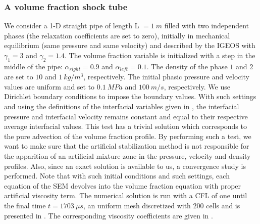 \documentclass[preprint,10pt]{elsarticle}
\begin{document}
\subsubsection{A volume fraction shock tube}\label{sec:vf-advection-test}
%
We consider a 1-D straight pipe of length L $=1 \ m$ filled with two independent phases (the relaxation coefficients are set to zero), initially in mechanical 
equilibrium (same pressure and same velocity) and described by the IGEOS with $\gamma_1 = 3$ and $\gamma_2 = 1.4$. The volume 
fraction variable is initialized with a step in the middle of the pipe: $\alpha_{right}=0.9$ and $\alpha_{left}=0.1$. The density of the phase $1$ and $2$ are set to $10$ and $1 \ kg/
m^3$, respectively. The initial phasic pressure and velocity values are uniform and set to $0.1 \ MPa$ and $100 \ m/s$, respectively. We use Dirichlet boundary conditions to impose the boundary values. With such settings and using the definitions of the interfacial variables given in , the interfacial pressure and 
interfacial velocity remains constant and equal to their respective average interfacial values. This test has a trivial solution which corresponds to the pure advection of the volume fraction 
profile. By performing such a test, we want to make sure that the artificial stabilization method is not responsible for the apparition of an artificial 
mixture zone in the pressure, velocity and density profiles. Also, since an exact solution is available to us, a convergence study is performed. 
Note that with such initial conditions and such settings, each equation of the SEM devolves into the volume fraction equation with proper artificial viscosity term. The 
numerical solution is run with a CFL of one until the final time $t=1703 \ \mu s$, an uniform mesh discretized with $200$ cells and is presented in . The corresponding viscosity coefficients are given in .
%
\end{document}
